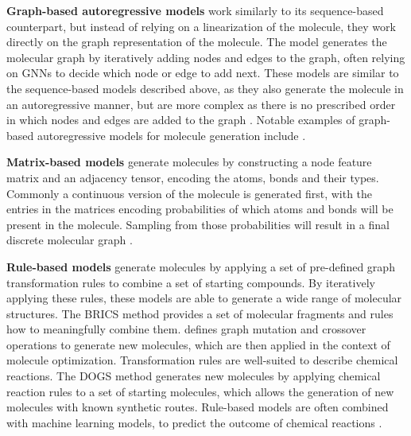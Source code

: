 \textbf{Graph-based autoregressive models} work similarly to its sequence-based counterpart, but
instead of relying on a linearization of the molecule, they work directly on the graph
representation of the molecule. The model generates the molecular graph by iteratively adding nodes
and edges to the graph, often relying on \acp{GNN} to decide which node or edge to add next. These
models are similar to the sequence-based models described above, as they also generate the molecule
in an autoregressive manner, but are more complex as there is no prescribed order in which nodes and
edges are added to the graph \citep{hanFittingAutoregressiveGraph2023}. Notable examples of
graph-based autoregressive models for molecule generation include
\citep{liuConstrainedGraphVariational2018,liLearningDeepGenerative2018,youGraphConvolutionalPolicy2019,cohen-karlikOvercomingOrderAutoregressive2024}.

\textbf{Matrix-based models}  generate molecules by constructing a node feature matrix and an
adjacency tensor, encoding the atoms, bonds and their types. Commonly a
continuous version of the molecule is generated first, with the entries in the matrices encoding
probabilities of which atoms and bonds will be present in the molecule. Sampling from
those probabilities will result in a final discrete molecular graph
\citep{simonovskyGraphVAEGenerationSmall2018,decaoMolGANImplicitGenerative2018,madhawaGraphNVPInvertibleFlow2019}.

\textbf{Rule-based models} generate molecules by applying a set of pre-defined graph transformation
rules to combine a set of starting compounds. By iteratively applying these rules, these models are
able to generate a wide range of molecular structures. The BRICS \citep{degenArtCompilingUsing2008}
method provides a set of molecular fragments and rules how to meaningfully combine them.
\citet{jensenGraphbasedGeneticAlgorithm2019} defines graph mutation and crossover operations to
generate new molecules, which are then applied in the context of molecule optimization.
Transformation rules are well-suited to describe chemical reactions. The DOGS method
\citep{hartenfellerDOGSReactionDrivenNovo2012} generates new molecules by applying chemical reaction
rules to a set of starting molecules, which allows the generation of new molecules with known
synthetic routes. Rule-based models are often combined with machine learning models, to predict the
outcome of chemical reactions
\citep{seglerNeuralSymbolicMachineLearning2017,seglerPlanningChemicalSyntheses2018,fortunatoDataAugmentationPretraining2020,daiRetrosynthesisPredictionConditional2020}.


